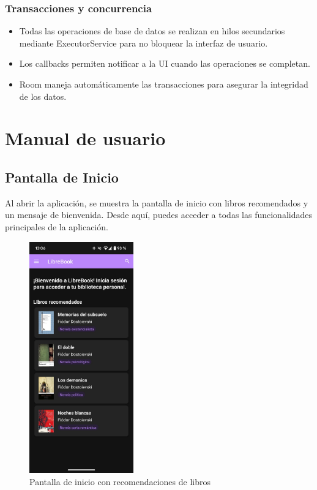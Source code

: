 \documentclass[a4paper,12pt]{report}
\begin{document}
      \subsection{Transacciones y concurrencia}
        \begin{itemize}
          \item Todas las operaciones de base de datos se realizan en hilos secundarios mediante ExecutorService para no bloquear la interfaz de usuario\cite{android_best_practices}.
          \item Los callbacks permiten notificar a la UI cuando las operaciones se completan.
          \item Room maneja automáticamente las transacciones para asegurar la integridad de los datos.
        \end{itemize}
  \chapter{Manual de usuario}
  \setlength{\intextsep}{10pt}        %
  \setlength{\abovecaptionskip}{5pt}  %
  \setlength{\belowcaptionskip}{10pt}  %
  \setlength{\parskip}{8pt}           %
  
  \section{Pantalla de Inicio}
  
    Al abrir la aplicación, se muestra la pantalla de inicio con libros recomendados y un mensaje de bienvenida. Desde aquí, puedes acceder a todas las funcionalidades principales de la aplicación.
    
    \begin{figure}[H]
      \centering
      \includegraphics[width=0.4\textwidth]{.img/inicio.png}
      \caption{Pantalla de inicio con recomendaciones de libros}
      \label{fig:inicio}
    \end{figure}
    
\end{document}
